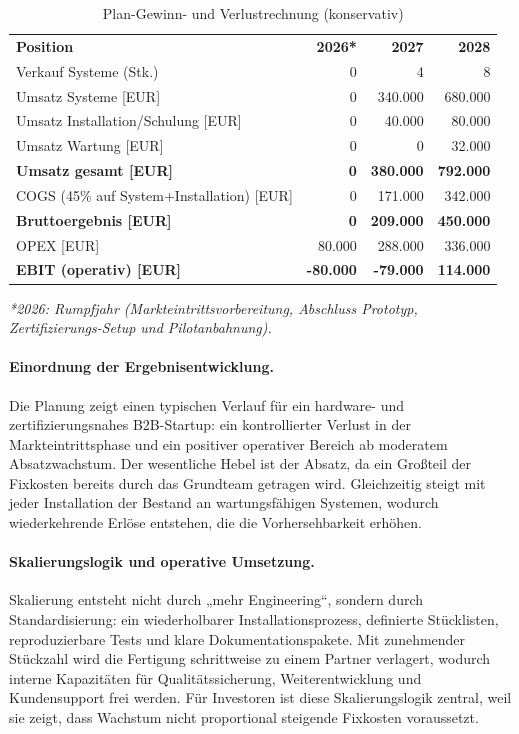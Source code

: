 \documentclass[11pt,a4paper]{article}
\begin{document}
\begin{table}[htbp]
\centering
\caption{Plan-Gewinn- und Verlustrechnung (konservativ)}
\label{tab:pnl}
\renewcommand{\arraystretch}{1.1}
\begin{tabular}{p{} r r r}
\textbf{Position} & \textbf{2026*} & \textbf{2027} & \textbf{2028}\\
Verkauf Systeme (Stk.) & 0 & 4 & 8\\
Umsatz Systeme [EUR] & 0 & 340.000 & 680.000\\
Umsatz Installation/Schulung [EUR] & 0 & 40.000 & 80.000\\
Umsatz Wartung [EUR] & 0 & 0 & 32.000\\
\textbf{Umsatz gesamt [EUR]} & \textbf{0} & \textbf{380.000} & \textbf{792.000}\\
COGS (45\% auf System+Installation) [EUR] & 0 & 171.000 & 342.000\\
\textbf{Bruttoergebnis [EUR]} & \textbf{0} & \textbf{209.000} & \textbf{450.000}\\
OPEX [EUR] & 80.000 & 288.000 & 336.000\\
\textbf{EBIT (operativ) [EUR]} & \textbf{-80.000} & \textbf{-79.000} & \textbf{114.000}\\
\end{tabular}
\end{table}

\noindent\textit{*2026: Rumpfjahr (Markteintrittsvorbereitung, Abschluss Prototyp, Zertifizierungs-Setup und Pilotanbahnung).}

\paragraph{Einordnung der Ergebnisentwicklung.}
Die Planung zeigt einen typischen Verlauf für ein hardware- und zertifizierungsnahes B2B-Startup: ein kontrollierter Verlust in der Markteintrittsphase und ein positiver operativer Bereich ab moderatem Absatzwachstum. Der wesentliche Hebel ist der Absatz, da ein Großteil der Fixkosten bereits durch das Grundteam getragen wird. Gleichzeitig steigt mit jeder Installation der Bestand an wartungsfähigen Systemen, wodurch wiederkehrende Erlöse entstehen, die die Vorhersehbarkeit erhöhen.

\paragraph{Skalierungslogik und operative Umsetzung.}
Skalierung entsteht nicht durch „mehr Engineering“, sondern durch Standardisierung: ein wiederholbarer Installationsprozess, definierte Stücklisten, reproduzierbare Tests und klare Dokumentationspakete. Mit zunehmender Stückzahl wird die Fertigung schrittweise zu einem Partner verlagert, wodurch interne Kapazitäten für Qualitätssicherung, Weiterentwicklung und Kundensupport frei werden. Für Investoren ist diese Skalierungslogik zentral, weil sie zeigt, dass Wachstum nicht proportional steigende Fixkosten voraussetzt.
\newpage
\end{document}
